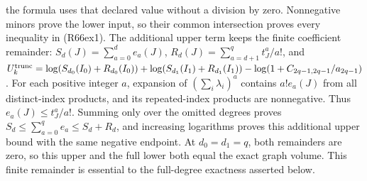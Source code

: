 the formula uses that declared value without a division by zero.
Nonnegative minors prove the lower input, so their common
intersection proves every inequality in (R66ex1).
The additional upper term keeps the finite coefficient remainder:
$S_d(J)=\sum_{a=0}^de_a(J)$,
$R_d(J)=\sum_{a=d+1}^qt_J^a/a!$, and
$U_k^{\rm trunc}=\log(S_{d_0}(I_0)+R_{d_0}(I_0))
+\log(S_{d_1}(I_1)+R_{d_1}(I_1))
-\log(1+C_{2q-1,2q-1}/a_{2q-1})$.
For each positive integer $a$, expansion of
$(\sum_i\lambda_i)^a$ contains $a!e_a(J)$ from all
distinct-index products, and its repeated-index products
are nonnegative. Thus $e_a(J)\leq t_J^a/a!$.
Summing only over the omitted degrees proves
$S_d\leq\sum_{a=0}^qe_a\leq S_d+R_d$, and increasing
logarithms proves this additional upper bound with the
same negative endpoint. At $d_0=d_1=q$, both remainders
are zero, so this upper and the full lower both equal
the exact graph volume. This finite remainder is essential
to the full-degree exactness asserted below.


